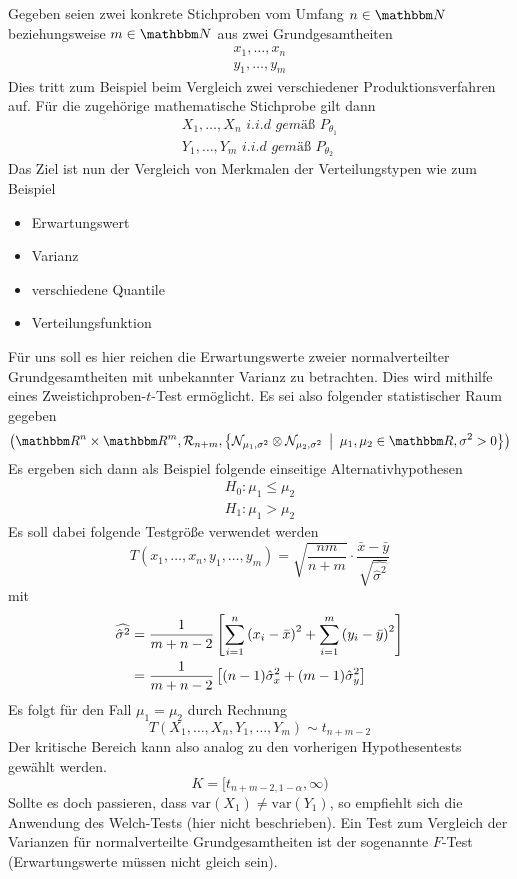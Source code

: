 	Gegeben seien zwei konkrete Stichproben vom Umfang $n\in\SN$ beziehungsweise $m\in\SN$ aus zwei Grundgesamtheiten
	\begin{align*}
		x_1,\ldots,x_n\\
		y_1,\ldots,y_m
	\end{align*}
	Dies tritt zum Beispiel beim Vergleich zwei verschiedener Produktionsverfahren auf.
	Für die zugehörige mathematische Stichprobe gilt dann
	\begin{align*}
		X_1,\ldots,X_n \textit{ i.i.d gemäß } P_{\theta_1} \\
		Y_1,\ldots,Y_m \textit{ i.i.d gemäß } P_{\theta_2}
	\end{align*}
	Das Ziel ist nun der Vergleich von Merkmalen der Verteilungstypen wie zum Beispiel
	\begin{itemize}
		\item Erwartungswert
		\item Varianz
		\item verschiedene Quantile
		\item Verteilungsfunktion 
	\end{itemize}
	Für uns soll es hier reichen die Erwartungswerte zweier normalverteilter Grundgesamtheiten mit unbekannter Varianz zu betrachten.
	Dies wird mithilfe eines Zweistichproben-$t$-Test ermöglicht.
	Es sei also folgender statistischer Raum gegeben
	\[
		\curvb{ \SR^n\times\SR^m, \mathcal{R}_{n+m}, \set{\mathcal{N}_{\mu_1, \sigma^2} \otimes \mathcal{N}_{\mu_2, \sigma^2} }{ \mu_1,\mu_2\in\SR, \sigma^2>0 } }
	\]
	Es ergeben sich dann als Beispiel folgende einseitige Alternativhypothesen
	\begin{align*}
		H_0: \mu_1\leq\mu_2 \\
		H_1: \mu_1>\mu_2
	\end{align*}
	Es soll dabei folgende Testgröße verwendet werden
	\[
		T(x_1,\ldots,x_n,y_1,\ldots,y_m) = \sqrt{\frac{nm}{n+m}}\cdot\frac{\bar{x}-\bar{y}}{\sqrt{\widehat{\hat{\sigma}^2}}}
	\]
	mit
	\begin{align*}
		\widehat{\hat{\sigma}^2} &= \frac{1}{m+n-2}\left[  \sum_{i=1}^n \left( x_i-\bar{x} \right)^2 + \sum_{i=1}^m \left( y_i-\bar{y} \right)^2  \right] \\
		&= \frac{1}{m+n-2}\left[  (n-1)\hat{\sigma}_x^2 + (m-1)\hat{\sigma}_y^2  \right]
	\end{align*}
	Es folgt für den Fall $ \mu_1=\mu_2 $ durch Rechnung
	\[
		T(X_1,\ldots,X_n,Y_1,\dots,Y_m) \sim t_{n+m-2}
	\]
	Der kritische Bereich kann also analog zu den vorherigen Hypothesentests gewählt werden.
	\[
		K = [t_{n+m-2,1-\alpha},\infty)
	\]
	Sollte es doch passieren, dass $\mathrm{var}(X_1)\neq\mathrm{var}(Y_1)$, so empfiehlt sich die Anwendung des Welch-Tests (hier nicht beschrieben).
	Ein Test zum Vergleich der Varianzen für normalverteilte Grundgesamtheiten ist der sogenannte $F$-Test (Erwartungswerte müssen nicht gleich sein).


